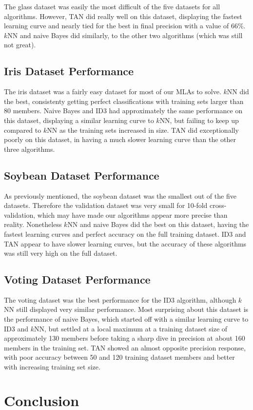 \documentclass{article}
\begin{document}
			The glass dataset was easily the most difficult of the five datasets for all algorithms. However, TAN did really well on this dataset, displaying the fastest learning curve and nearly tied for the best in final precision with a value of 66\%. $k$NN and naive Bayes did similarly, to the other two algorithms (which was still not great).
		
		\subsection{Iris Dataset Performance}
		
			The iris dataset was a fairly easy dataset for most of our MLAs to solve. $k$NN did the best, consistenty getting perfect classifications with training sets larger than 80 members. Naive Bayes and ID3 had approximately the same performance on this dataset, displaying a similar learning curve to $k$NN, but failing to keep up compared to $k$NN as the training sets increased in size. TAN did exceptionally poorly on this dataset, in having a much slower learning curve than the other three algorithms.
		
		\subsection{Soybean Dataset Performance}
		
			As previously mentioned, the soybean dataset was the smallest out of the five datasets. Therefore the validation dataset was very small for 10-fold cross-validation, which may have made our algorithms appear more precise than reality. Nonetheless $k$NN and naive Bayes did the best on this dataset, having the fastest learning curves and perfect accuracy on the full training dataset. ID3 and TAN appear to have slower learning curves, but the accuracy of these algorithms was still very high on the full dataset.
		
		\subsection{Voting Dataset Performance}
		
			The voting dataset was the best performance for the ID3 algorithm, although $k$NN still displayed very similar performance. Most surprising about this dataset is the performance of naive Bayes, which started off with a similar learning curve to ID3 and $k$NN, but settled at a local maximum at a training dataset size of approximately 130 members before taking a sharp dive in precision at about 160 members in the training set. TAN showed an almost opposite precision response, with poor accuracy between 50 and 120 training dataset members and better with increasing training set size.

\section{Conclusion}
	

	\pagebreak


	
	
	
\end{document}
